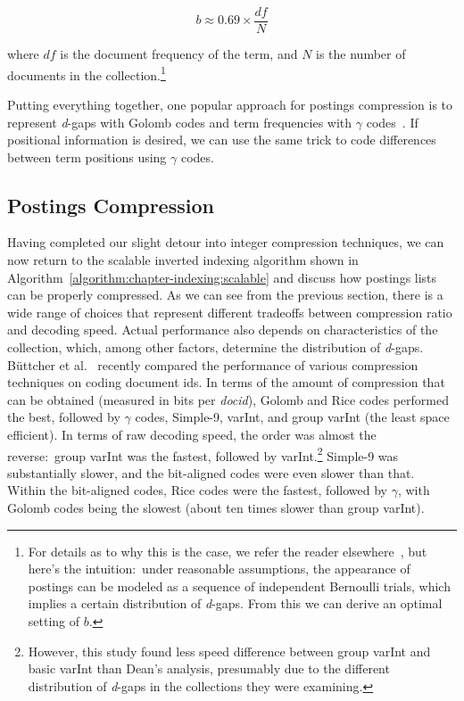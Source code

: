\begin{equation}
b \approx 0.69 \times \frac{df}{N}
\end{equation}

\noindent where $df$ is the document frequency of the term, and $N$ is
the number of documents in the collection.\footnote{For details as to
  why this is the case, we refer the reader
  elsewhere~\cite{Witten_etal_1999}, but here's the intuition:\ under
  reasonable assumptions, the appearance of postings can be modeled as
  a sequence of independent Bernoulli trials, which implies a certain
  distribution of \emph{d}-gaps.  From this we can derive an optimal
  setting of $b$.}

Putting everything together, one popular approach for postings
compression is to represent \emph{d}-gaps with Golomb codes and term
frequencies with $\gamma$
codes~\cite{Witten_etal_1999,Zobel_Moffat_2006}.  If positional
information is desired, we can use the same trick to code differences
between term positions using $\gamma$ codes.

\subsection{Postings Compression}

Having completed our slight detour into integer compression
techniques, we can now return to the scalable inverted indexing
algorithm shown in Algorithm~\ref{algorithm:chapter-indexing:scalable} and discuss
how postings lists can be properly compressed.  As we can see from the
previous section, there is a wide range of choices that represent
different tradeoffs between compression ratio and decoding speed.
Actual performance also depends on characteristics of the collection,
which, among other factors, determine the distribution of \emph{
  d}-gaps.  B\"uttcher et al.~\cite{Buttcher_etal_2010} recently
compared the performance of various compression techniques on coding
document ids.  In terms of the amount of compression that can be
obtained (measured in bits per \emph{docid}), Golomb and Rice codes
performed the best, followed by $\gamma$ codes, Simple-9, varInt, and
group varInt (the least space efficient).  In terms of raw decoding
speed, the order was almost the reverse:\ group varInt was the
fastest, followed by varInt.\footnote{However, this study found less
  speed difference between group varInt and basic varInt than Dean's
  analysis, presumably due to the different distribution of \emph{d}-gaps
  in the collections they were examining.}  Simple-9 was substantially
slower, and the bit-aligned codes were even slower than that.  Within
the bit-aligned codes, Rice codes were the fastest, followed by
$\gamma$, with Golomb codes being the slowest (about ten times slower
than group varInt).

